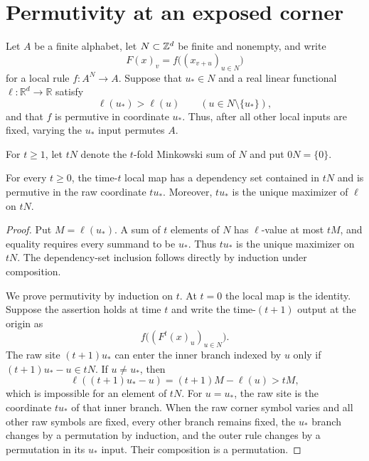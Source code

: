 \section{Permutivity at an exposed corner}
\label{sec:corner}

Let $A$ be a finite alphabet, let $N\subset\mathbb{Z}^d$ be finite and nonempty, and
write
\begin{equation}\label{eq:local-rule}
  F(x)_v=f\bigl((x_{v+u})_{u\in N}\bigr)
\end{equation}
for a local rule $f\colon A^N\to A$.  Suppose that $u_*\in N$ and a real
linear functional $\ell\colon\mathbb R^d\to\mathbb R$ satisfy
\begin{equation}\label{eq:exposed}
  \ell(u_*)>\ell(u)\qquad(u\in N\setminus\{u_*\}),
\end{equation}
and that $f$ is permutive in coordinate $u_*$.  Thus, after all other local
inputs are fixed, varying the $u_*$ input permutes $A$.

For $t\geq1$, let $tN$ denote the $t$-fold Minkowski sum of $N$ and put
$0N=\{0\}$.

\begin{lemma}\label{lem:corner-iterate}
For every $t\geq0$, the time-$t$ local map has a dependency set contained in
$tN$ and is permutive in the raw coordinate $tu_*$.  Moreover, $tu_*$ is
the unique maximizer of $\ell$ on $tN$.
\end{lemma}

\begin{proof}
Put $M=\ell(u_*)$.  A sum of $t$ elements of $N$ has $\ell$-value at most
$tM$, and equality requires every summand to be $u_*$.  Thus $tu_*$ is the
unique maximizer on $tN$.  The dependency-set inclusion follows directly by
induction under composition.

We prove permutivity by induction on $t$.  At $t=0$ the local map is the
identity.  Suppose the assertion holds at time $t$ and write the
time-$(t+1)$ output at the origin as
\[
  f\bigl((F^t(x)_u)_{u\in N}\bigr).
\]
The raw site $(t+1)u_*$ can enter the inner branch indexed by $u$ only if
$(t+1)u_*-u\in tN$.  If $u\neq u_*$, then
\[
   \ell((t+1)u_*-u)=(t+1)M-\ell(u)>tM,
\]
which is impossible for an element of $tN$.  For $u=u_*$, the raw site is
the coordinate $tu_*$ of that inner branch.  When the raw corner symbol
varies and all other raw symbols are fixed, every other branch remains
fixed, the $u_*$ branch changes by a permutation by induction, and the outer
rule changes by a permutation in its $u_*$ input.  Their composition is a
permutation.
\end{proof}

